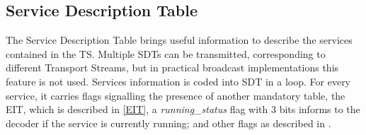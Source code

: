 \documentclass[
	12pt,				%
	openright,			%
	twoside,			%
	a4paper,			%
	brazil,
	french,				%
	english
	]{abntex2}
\begin{document}
\subsection{Service Description Table}
\label{SDT}
The Service Description Table brings useful information to describe the services contained in the TS. Multiple SDTs can be transmitted, corresponding to different Transport Streams, but in practical broadcast implementations this feature is not used. Services information is coded into SDT in a loop. For every service, it carries flags signalling the presence of another mandatory table, the EIT, which is described in \autoref{EIT}, a \textit{running\hspace{0.1mm}\_\hspace{0.1mm}status} flag with 3 bits informs to the decoder if the service is currently running; and other flags as described in .
\end{document}
